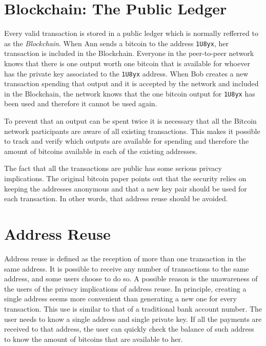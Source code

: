\documentclass[journal]{IEEEtran}
\begin{document}
\section{Blockchain: The Public Ledger}

Every valid transaction is stored in a public ledger which is normally refferred to as the \emph{ Blockchain}.
When Ann sends a bitcoin to the address \texttt{1U8yx}, her transaction is included in the Blockchain.
Everyone in the peer-to-peer network knows that there is one output worth one bitcoin that is available for whoever has the private key associated to the \texttt{1U8yx} address.
When Bob creates a new transaction spending that output and it is accepted by the network and included in the Blockchain, the network knows that the one bitcoin output for \texttt{1U8yx} has been used and therefore it cannot be used again.

To prevent that an output can be spent twice it is necessary that all the Bitcoin network participants are aware of all existing transactions.
This makes it possible to track and verify which outputs are available for spending and therefore the amount of bitcoins available in each of the existing addresses.

The fact that all the transactions are public has some serious privacy implications.
The original bitcoin paper \cite{nakamoto2008bpp} points out that the security relies on keeping the addresses anonymous and that a new key pair should be used for each transaction.
In other words, that address reuse should be avoided.

\section{Address Reuse}

Address reuse is defined as the reception of more than one transaction in the same address.
It is possible to receive any number of transactions to the same address, and some users choose to do so.
A possible reason is the unawareness of the users of the privacy implications of address reuse.
In principle, creating a single address seems more convenient than generating a new one for every transaction.
This use is similar to that of a traditional bank account number.
The user needs to know a single address and single private key.
If all the payments are received to that address, the user can quickly check the balance of such address to know the amount of bitcoins that are available to her.
\end{document}
